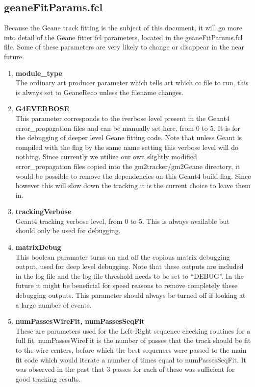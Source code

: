   \subsection{geaneFitParams.fcl}

    Because the Geane track fitting is the subject of this document, it will go more into detail of the Geane fitter fcl parameters, located in the geaneFitParams.fcl file. Some of these parameters are very likely to change or disappear in the near future.

    \begin{enumerate}

      \item{\bf{module\_type}} \\
      The ordinary art producer parameter which tells art which cc file to run, this is always set to GeaneReco unless the filename changes.

      \item{\bf{G4EVERBOSE}} \\
      This parameter corresponds to the iverbose level present in the Geant4 error\_propagation files and can be manually set here, from 0 to 5. It is for the debugging of deeper level Geane fitting code. Note that unless Geant is compiled with the flag by the same name setting this verbose level will do nothing. Since currently we utilize our own slightly modified error\_propagation files copied into the gm2tracker/gm2Geane directory, it would be possible to remove the dependencies on this Geant4 build flag. Since however this will slow down the tracking it is the current choice to leave them in. 

      \item{\bf{trackingVerbose}} \\
      Geant4 tracking verbose level, from 0 to 5. This is always available but should only be used for debugging.

      \item{\bf{matrixDebug}} \\
      This boolean paramater turns on and off the copious matrix debugging output, used for deep level debugging. Note that these outputs are included in the log file and the log file threshold needs to be set to ``DEBUG''. In the future it might be beneficial for speed reasons to remove completely these debugging outputs. This parameter should always be turned off if looking at a large number of events.

      \item{\bf{numPassesWireFit, numPassesSeqFit}} \\
      These are parameters used for the Left-Right sequence checking routines for a full fit. numPassesWireFit is the number of passes that the track should be fit to the wire centers, before which the best sequences were passed to the main fit code which would iterate a number of times equal to numPassesSeqFit. It was observed in the past that 3 passes for each of these was sufficient for good tracking results. 


\end{enumerate}
